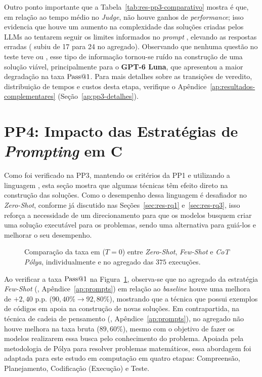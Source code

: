 Outro ponto importante que a Tabela~\ref{tab:res-pp3-comparativo} mostra é que, em relação ao tempo médio no \textit{Judge}, não houve ganhos de \textit{performance}; isso evidencia que houve um aumento na complexidade das soluções criadas pelos LLMs ao tentarem seguir os limites informados no \textit{prompt} , elevando as respostas erradas ( subiu de 17 para 24 no agregado). Observando que nenhuma questão no teste teve  ou , esse tipo de informação tornou-se ruído na construção de uma solução viável, principalmente para o \textbf{GPT-6 Luna}, que apresentou a maior degradação na taxa $\mathrm{Pass@}1$. Para mais detalhes sobre as transições de veredito, distribuição de tempos e custos desta etapa, verifique o Apêndice~\ref{ap:resultados-complementares} (Seção~\ref{ap:pp3-detalhes}).

\section{PP4: Impacto das Estratégias de \texorpdfstring{\textit{Prompting}}{Prompting} em C}\label{sec:res-rq4}

Como foi verificado na PP3, mantendo os critérios da PP1 e utilizando a linguagem , esta seção mostra que algumas técnicas têm efeito direto na construção das soluções. Como o desempenho dessa linguagem é desafiador no \textit{Zero-Shot}, conforme já discutido nas Seções~\ref{sec:res-rq1} e~\ref{sec:res-rq3}, isso reforça a necessidade de um direcionamento para que os modelos busquem criar uma solução executável para os problemas, sendo uma alternativa para guiá-los e melhorar o seu desempenho.

\begin{figure}[!htbp]
\centering

\caption[Pass@1 em C por estratégia de prompting na PP4]{Comparação da taxa  em  ($T=0$) entre \textit{Zero-Shot}, \textit{Few-Shot} e \textit{CoT Pólya}, individualmente e no agregado das $375$ execuções.}
\label{fig:res-pp4-pass1}
\end{figure}
\FloatBarrier

Ao verificar a taxa $\mathrm{Pass@}1$ na Figura~\ref{fig:res-pp4-pass1}, observa-se que no agregado da estratégia \textit{Few-Shot} (, Apêndice~\ref{ap:prompts}) em relação ao \textit{baseline} houve uma melhora de $+2{,}40\text{ p.p.}$ ($90{,}40\% \rightarrow 92{,}80\%$), mostrando que a técnica que possui exemplos de códigos em  apoia na construção de novas soluções. Em contrapartida, na técnica de cadeia de pensamento (, Apêndice~\ref{ap:prompts}), no agregado não houve melhora na taxa bruta ($89{,}60\%$), mesmo com o objetivo de fazer os modelos realizarem essa busca pelo conhecimento do problema. Apoiada pela metodologia de Pólya para resolver problemas matemáticos, essa abordagem foi adaptada para este estudo em computação em quatro etapas: Compreensão, Planejamento, Codificação (Execução) e Teste.

